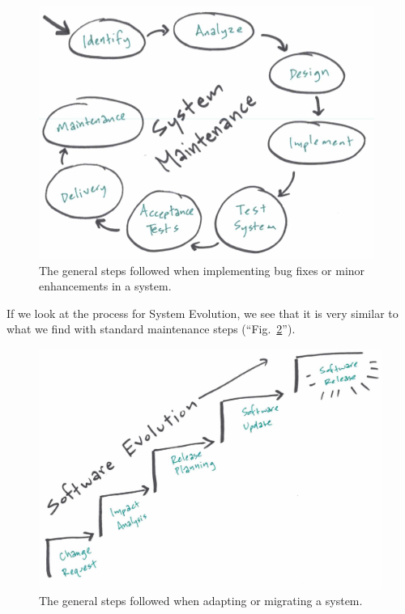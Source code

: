 \documentclass[12pt,conference]{IEEEtran}
\begin{document}
\begin{figure}[ht]
    \centerline{
        \includegraphics[width=0.8\columnwidth]{Maintenance}
    }
    \caption{The general steps followed when implementing bug fixes or minor enhancements in a system.}
    \label{figSystemMaintenance}
\end{figure}

If we look at the process for System Evolution, we see that it is very similar to what we find with standard maintenance steps (``Fig.~\ref{figSystemEvolution}'').

\begin{figure}[ht]
    \centerline{
        \includegraphics[width=0.8\columnwidth]{Evolution}
    }
    \caption{The general steps followed when adapting or migrating a system.}
    \label{figSystemEvolution}
\end{figure}

\end{document}

